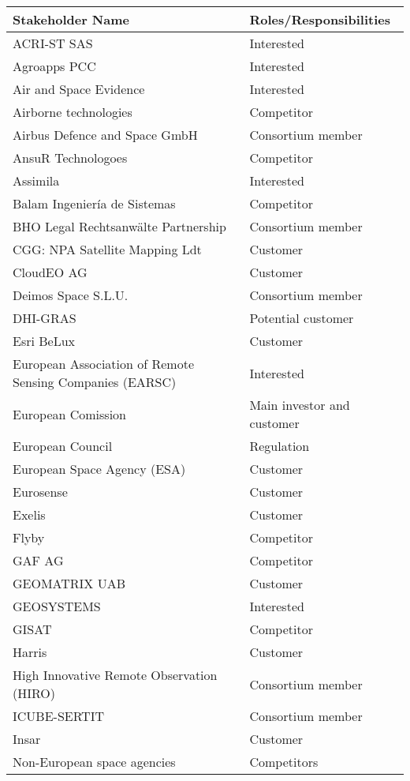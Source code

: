 \begin{small}
\begin{longtable}{p{9.5cm}l}

	\toprule[2pt]
		
	\textbf{Stakeholder Name} & \textbf{Roles/Responsibilities } 
	\\ \midrule[1.5pt]
	\endhead

	ACRI-ST SAS & Interested\\
	Agroapps PCC & Interested\\
	Air and Space Evidence & Interested\\
	Airborne technologies & Competitor\\
	Airbus Defence and Space GmbH & Consortium member  \\ 
	AnsuR Technologoes & Competitor\\
	Assimila & Interested\\
	Balam Ingeniería de Sistemas & Competitor\\
	BHO Legal Rechtsanwälte Partnership & Consortium member\\ 
	CGG: NPA Satellite Mapping Ldt&Customer\\
	CloudEO AG&Customer\\
	Deimos Space S.L.U.  & Consortium member \\
	DHI-GRAS&Potential customer\\
	Esri BeLux&Customer\\
	European Association of Remote Sensing Companies (EARSC)&Interested\\
	European Comission&Main investor and customer\\
	European Council&Regulation\\
	European Space Agency (ESA)&Customer\\ 
	Eurosense&Customer\\
	Exelis&Customer\\
	Flyby&Competitor\\
	GAF AG&Competitor\\
	GEOMATRIX UAB&Customer\\
	GEOSYSTEMS&Interested\\
	GISAT&Competitor\\
	Harris&Customer\\
	High Innovative Remote Observation (HIRO) & Consortium member \\ 
	ICUBE-SERTIT                        & Consortium member \\ 
	Insar&Customer\\
	Non-European space agencies&Competitors\\

\end{longtable}
\end{small}
